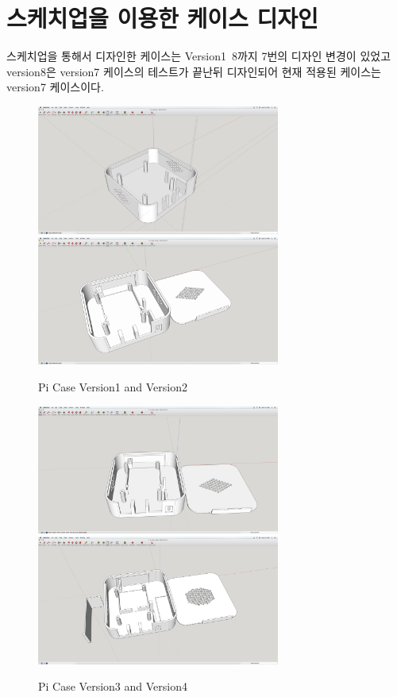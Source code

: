 \documentclass[11pt
  , a4paper
  , article
  , oneside
]{memoir}
\begin{document}
\section{스케치업을 이용한 케이스 디자인}
스케치업을 통해서 디자인한 케이스는 Version1~8까지 7번의 디자인 변경이 있었고 version8은 version7 케이스의 테스트가 끝난뒤 디자인되어 현재 적용된 케이스는 version7 케이스이다.
\clearpage
\begin{center}
	\begin{figure}[h]
		\includegraphics[width=8cm]{./images/V1.png}
		\includegraphics[width=8cm]{./images/V2.png}
		\caption{Pi Case Version1 and Version2}
	\end{figure}
\end{center}
\begin{center}
	\begin{figure}[h]
		\includegraphics[width=8cm]{./images/V3.png}
		\includegraphics[width=8cm]{./images/V4.png}
		\caption{Pi Case Version3 and Version4}
	\end{figure}
\end{center}
\end{document}
